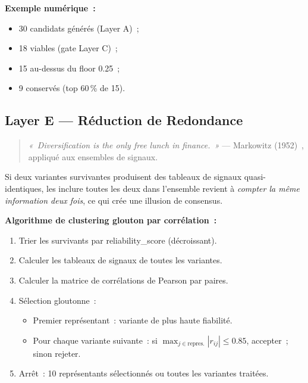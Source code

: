 \textbf{Exemple numérique~:}
\begin{itemize}
    \item 30 candidats générés (Layer A)~;
    \item 18 viables (gate Layer C)~;
    \item 15 au-dessus du floor 0.25~;
    \item 9 conservés (top 60\,\% de 15).
\end{itemize}

\subsection{Layer E — Réduction de Redondance}

\begin{quote}
\textit{«~Diversification is the only free lunch in finance.~»}
— Markowitz (1952)~\cite{markowitz1952}, appliqué aux ensembles de signaux.
\end{quote}

Si deux variantes survivantes produisent des tableaux de signaux quasi-identiques,
les inclure toutes les deux dans l'ensemble revient à \emph{compter la même information
deux fois}, ce qui crée une illusion de consensus.

\textbf{Algorithme de clustering glouton par corrélation~:}

\begin{enumerate}
    \item Trier les survivants par reliability\_score (décroissant).
    \item Calculer les tableaux de signaux de toutes les variantes.
    \item Calculer la matrice de corrélations de Pearson par paires.
    \item Sélection gloutonne~:
    \begin{itemize}
        \item Premier représentant~: variante de plus haute fiabilité.
        \item Pour chaque variante suivante~: si $\max_{j \in \text{repres.}} |r_{ij}| \leq 0.85$, accepter~; sinon rejeter.
    \end{itemize}
    \item Arrêt~: 10 représentants sélectionnés ou toutes les variantes traitées.
\end{enumerate}


